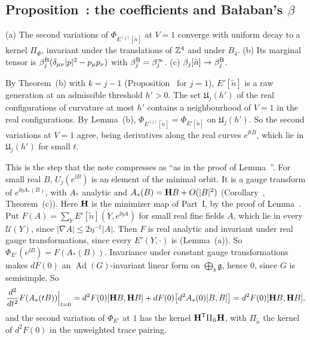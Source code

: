 \subsection{Proposition~\texorpdfstring{}{58.8}: the coefficients and Ba\l aban's \texorpdfstring{$\beta$}{beta}}\label{d11b:beta}

\begin{detail}\label{d11b:beta-identification}
(a) The second variations of $\Phi_{E^{(j)}[\tilde n]}$ at $V=1$ converge with uniform decay to a kernel $\Pi_\Phi$, invariant under the translations of $\mathbb Z^4$ and under $B_4$. (b) Its marginal tensor is $\beta^{\rm B}_j(\delta_{\mu\nu}|p|^2-p_\mu p_\nu)$ with $\beta^{\rm B}_j=\beta^\infty_j$. (c) $\beta_j[\tilde n]\to\beta^{\rm B}_j$.
\end{detail}

\begin{step}
By Theorem~(b) with $k=j-1$ (Proposition~ for $j=1$), $E'[\tilde n]$ is a raw generation at an admissible threshold $h'>0$. The set $\mathfrak U_j(h')$ of the real configurations of curvature at most $h'$ contains a neighbourhood of $V=1$ in the real configurations. By Lemma~(b), $\Phi_{E^{(j)}[\tilde n]}=\Phi_{E'[\tilde n]}$ on $\mathfrak U_j(h')$. So the second variations at $V=1$ agree, being derivatives along the real curves $e^{\ii tB}$, which lie in $\mathfrak U_j(h')$ for small $t$.
\end{step}

\begin{step}
This is the step that the note compresses as ``as in the proof of Lemma~''. For small real $B$, $U_j(e^{\ii B})$ is an element of the minimal orbit. It is a gauge transform of $e^{\ii\eta A_*(B)}$, with $A_*$ analytic and $A_*(B)=\mathbf H B+O(|B|^2)$ (Corollary~, Theorem~(c)). Here $\mathbf H$ is the minimizer map of Part~I, by the proof of Lemma~. Put $F(A)=\sum_YE'[\tilde n](Y,e^{\ii\eta A})$ for small real fine fields $A$, which lie in every $\mathcal U(Y)$, since $|\nabla A|\le2\eta^{-1}|A|$. Then $F$ is real analytic and invariant under real gauge transformations, since every $E'(Y,\cdot)$ is (Lemma~(a)). So $\Phi_{E'}(e^{\ii B})=F(A_*(B))$. Invariance under constant gauge transformations makes $dF(0)$ an $\operatorname{Ad}(G)$-invariant linear form on $\bigoplus_b\mathfrak g$, hence $0$, since $G$ is semisimple. So
\[
\frac{d^2}{dt^2}F(A_*(tB))\Big|_{t=0}=d^2F(0)[\mathbf H B,\mathbf H B]+dF(0)\big[d^2A_*(0)[B,B]\big]=d^2F(0)[\mathbf H B,\mathbf H B],
\]
and the second variation of $\Phi_{E'}$ at $1$ has the kernel $\mathbf H^{\sf T}\Pi_{\tilde n}\mathbf H$, with $\Pi_{\tilde n}$ the kernel of $d^2F(0)$ in the unweighted trace pairing.
\end{step}

